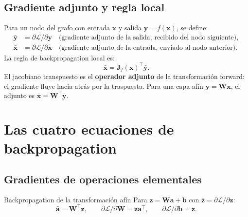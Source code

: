 \subsection{Gradiente adjunto y regla local}
\label{subsec:adjunto_local}

Para un nodo del grafo con entrada $\bm{x}$ y salida
$\bm{y} = f(\bm{x})$, se define:
\begin{align}
  \bar{\bm{y}} &= \partial\mathcal{L}/\partial\bm{y}
  \quad\text{(gradiente adjunto de la salida, recibido del nodo siguiente)},
  \label{eq:adjunto_salida}\\
  \bar{\bm{x}} &= \partial\mathcal{L}/\partial\bm{x}
  \quad\text{(gradiente adjunto de la entrada, enviado al nodo anterior)}.
  \label{eq:adjunto_entrada}
\end{align}
La regla de backpropagation local es:
\begin{equation}
  \bar{\bm{x}} = \bm{J}_f(\bm{x})^\top\bar{\bm{y}}.
  \label{eq:bp_local}
\end{equation}
El jacobiano transpuesto es el \textbf{operador adjunto} de la
transformación forward: el gradiente fluye hacia atrás por la traspuesta.
Para una capa afín $\bm{y} = \bm{W}\bm{x}$, el adjunto es
$\bar{\bm{x}} = \bm{W}^\top\bar{\bm{y}}$.

\section{Las cuatro ecuaciones de backpropagation}
\label{sec:cuatro_ec}


\subsection{Gradientes de operaciones elementales}
\label{subsec:bp_elem}

\begin{proposicion}{Backpropagation de la transformación afín}
\label{prop:bp_afin}
Para $\bm{z} = \bm{W}\bm{a} + \bm{b}$ con
$\bar{\bm{z}} = \partial\mathcal{L}/\partial\bm{z}$:
\begin{equation}
  \bar{\bm{a}} = \bm{W}^\top\bar{\bm{z}}, \qquad
  \partial\mathcal{L}/\partial\bm{W} = \bar{\bm{z}}\bm{a}^\top, \qquad
  \partial\mathcal{L}/\partial\bm{b} = \bar{\bm{z}}.
  \label{eq:bp_afin}
\end{equation}
\end{proposicion}

